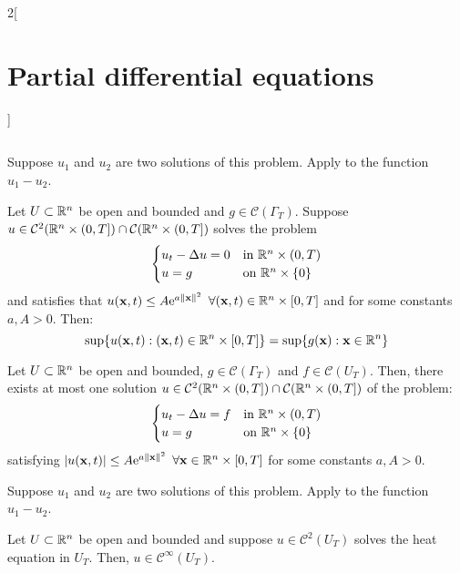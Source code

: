 \documentclass[../../../main_math.tex]{subfiles}
\begin{document}
\begin{multicols}{2}[\section{Partial differential equations}]
\begin{theorem}
$$    $$
  \end{theorem}
  \begin{sproof}
    Suppose $u_1$ and $u_2$ are two solutions of this problem. Apply  to the function $u_1-u_2$.
  \end{sproof}
  \begin{theorem}\label{PDE:Cauchymax}
    Let $U\subset\mathbb{R}^n$ be open and bounded and $g\in\mathcal{C}(\Gamma_T)$. Suppose $u\in\mathcal{C}^2(\mathbb{R}^n\times (0,T])\cap\mathcal{C}(\mathbb{R}^n\times (0,T])$ solves the problem
    $$
      \begin{cases}
        u_{t}  -\Delta{u} = 0 & \text{in $\mathbb{R}^n\times (0,T)$} \\
        u=g                       & \text{on $\mathbb{R}^n\times \{0\}$}
      \end{cases}
    $$ and satisfies that $u(\boldsymbol{\mathrm{x}},t)\leq A\mathrm{e}^{a\left\|\boldsymbol{\mathrm{x}}\right\|^2}$ $\forall (\boldsymbol{\mathrm{x}},t)\in\mathbb{R}^n\times [0,T]$ and for some constants $a, A> 0$. Then:
    $$\displaystyle\sup\{u(\boldsymbol{\mathrm{x}},t):(\boldsymbol{\mathrm{x}},t)\in\mathbb{R}^n\times[0,T]\}=\sup\{g(\boldsymbol{\mathrm{x}}):\boldsymbol{\mathrm{x}}\in\mathbb{R}^n\}$$
  \end{theorem}
  \begin{theorem}
    Let $U\subset\mathbb{R}^n$ be open and bounded, $g\in\mathcal{C}(\Gamma_T)$ and $f\in\mathcal{C}(U_T)$. Then, there exists at most one solution $u\in\mathcal{C}^2(\mathbb{R}^n\times (0,T])\cap\mathcal{C}(\mathbb{R}^n\times (0,T])$ of the problem:
    $$
      \begin{cases}
        u_{t}  -\Delta{u} = f & \text{in $\mathbb{R}^n\times (0,T)$} \\
        u=g                       & \text{on $\mathbb{R}^n\times \{0\}$}
      \end{cases}
    $$
    satisfying $\abs{u(\boldsymbol{\mathrm{x}},t)}\leq A\mathrm{e}^{a\left\|\boldsymbol{\mathrm{x}}\right\|^2}$ $\forall \boldsymbol{\mathrm{x}}\in\mathbb{R}^n\times [0,T]$ for some constants $a, A>0$.
  \end{theorem}
  \begin{sproof}
    Suppose $u_1$ and $u_2$ are two solutions of this problem. Apply  to the function $u_1-u_2$.
  \end{sproof}
  \begin{theorem}[Smoothness]
    Let $U\subset\mathbb{R}^n$ be open and bounded and suppose $u\in\mathcal{C}^2( U_T)$ solves the heat equation in $U_T$. Then, $u\in\mathcal{C}^\infty(U_T)$.
  \end{theorem}

\end{multicols}
\end{document}
